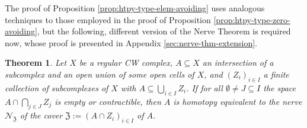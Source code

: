 \documentclass[a4paper,11pt,reqno, english]{amsart}
\newtheorem{theorem}{Theorem}[section]
\theoremstyle{definition}
\theoremstyle{remark}
\begin{document}
The proof of Proposition \ref{prop:htpy-type-elem-avoiding} uses analogous techniques to those employed in the proof of Proposition \ref{prop:htpy-type-zero-avoiding}, but the following, different version of the Nerve Theorem is required now, whose proof is presented in Appendix \ref{sec:nerve-thm-extension}.
\begin{theorem}\label{thm:nerve-closed-cellular}
    Let $X$ be a regular CW complex, $A\subseteq X$ an intersection of a subcomplex and an open union of some open cells of $X$, and $(Z_i)_{i\in I}$ a finite collection of subcomplexes of $X$ with $A\subseteq\bigcup_{i\in I}Z_i$. If for all $\emptyset\neq J\subseteq I$ the space $A\cap\bigcap_{j\in J}Z_j$ is empty or contractible, then $A$ is homotopy equivalent to the nerve $\mathscr{N}_{\mathfrak{Z}}$ of the cover $\mathfrak{Z}:=(A\cap Z_i)_{i\in I}$ of $A$.
\end{theorem}
\end{document}
